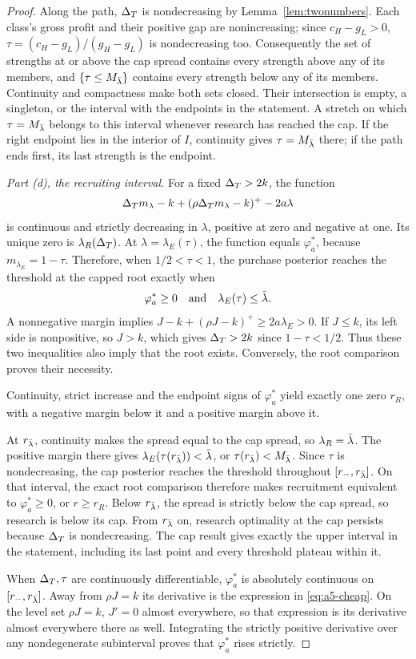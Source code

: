 \begin{proof}
Along the path, \(\Delta_T\) is nondecreasing by Lemma~\ref{lem:twonumbers}.
Each class's gross profit and their positive gap are nonincreasing;
since \(c_H-g_L>0\), \(\tau=(c_H-g_L)/(g_H-g_L)\) is nondecreasing too. Consequently
the set of strengths at or above the cap spread contains every strength above any of its members, and
\(\{\tau\le M_{\bar\lambda}\}\) contains every strength below any of its members. Continuity and compactness make
both sets closed. Their intersection is empty, a singleton, or the interval with the endpoints in the statement.
A stretch on which \(\tau=M_{\bar\lambda}\) belongs to this interval whenever research has reached the cap. If the right
endpoint lies in the interior of \(I\), continuity gives \(\tau=M_{\bar\lambda}\) there; if the path ends first, its
last strength is the endpoint.

\emph{Part (d), the recruiting interval.}
For a fixed \(\Delta_T>2k\), the function
\[
 \Delta_T m_\lambda-k+(\rho\Delta_T m_\lambda-k)^+-2a\lambda
\]
is continuous and strictly decreasing in \(\lambda\), positive at zero and negative at one. Its unique zero is
\(\lambda_R(\Delta_T)\). At \(\lambda=\lambda_E(\tau)\), the function equals \(\varphi_a^*\), because
\(m_{\lambda_E}=1-\tau\). Therefore, when \(1/2<\tau<1\), the purchase posterior reaches the threshold at the
capped root exactly when
\[
 \varphi_a^*\ge0\quad\hbox{and}\quad\lambda_E(\tau)\le\bar\lambda.
\]
A nonnegative margin implies \(J-k+(\rho J-k)^+\ge2a\lambda_E>0\). If \(J\le k\), its left side is nonpositive,
so \(J>k\), which gives \(\Delta_T>2k\) since \(1-\tau<1/2\). Thus these two inequalities also imply that the root
exists. Conversely, the root comparison proves their necessity.

Continuity, strict increase and the endpoint signs of \(\varphi_a^*\) yield exactly one zero \(r_R\), with a
negative margin below it and a positive margin above it.

At \(r_{\bar\lambda}\), continuity makes the spread equal to the cap spread, so \(\lambda_R=\bar\lambda\). The positive margin there gives
\(\lambda_E(\tau(r_{\bar\lambda}))<\bar\lambda\), or \(\tau(r_{\bar\lambda})<M_{\bar\lambda}\). Since \(\tau\) is nondecreasing, the cap
posterior reaches the threshold throughout \([r_-,r_{\bar\lambda}]\). On that interval, the exact root comparison
therefore makes recruitment equivalent to \(\varphi_a^*\ge0\), or \(r\ge r_R\). Below \(r_{\bar\lambda}\), the spread
is strictly below the cap spread, so research is below its cap. From \(r_{\bar\lambda}\) on, research optimality at the
cap persists because \(\Delta_T\) is nondecreasing. The cap result gives exactly the upper interval in the statement,
including its last point and every threshold plateau within it.

When \(\Delta_T,\tau\) are continuously differentiable, \(\varphi_a^*\) is absolutely continuous on
\([r_-,r_{\bar\lambda}]\). Away from \(\rho J=k\) its derivative is the expression in \eqref{eq:a5-cheap}.
On the level set \(\rho J=k\), \(J'=0\) almost everywhere, so that expression is its derivative almost
everywhere there as well. Integrating the strictly positive derivative over any nondegenerate subinterval
proves that \(\varphi_a^*\) rises strictly.
\end{proof}


